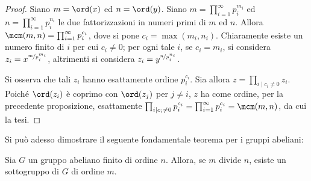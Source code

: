 \documentclass[12pt]{scrartcl}
\begin{document}
	\begin{proof}
		Siano $m = \ord(x)$ ed $n = \ord(y)$. Siano $m = \prod_{i = 1}^\infty p_i^{m_i}$
		ed $n = \prod_{i = 1}^\infty p_i^{n_i}$ le due fattorizzazioni in numeri primi
		di $m$ ed $n$. Allora $\mcm(m, n) = \prod_{i = 1}^\infty p_i^{c_i}$,
		dove si pone $c_i = \max(m_i, n_i)$. Chiaramente esiste un numero finito di
		$i$ per cui $c_i \neq 0$; per ogni tale $i$, se $c_i = m_i$, si considera
		$z_i = x^{\nicefrac{m}{p_i^{m_i}}}$, altrimenti si considera
		$z_i = y^{\nicefrac{n}{p_i^{n_i}}}$. \medskip
		
		
		Si osserva che tali $z_i$ hanno esattamente ordine $p_i^{c_i}$.
		Sia allora $z = \prod_{i \mid c_i \neq 0} z_i$. Poiché $\ord(z_i)$ è coprimo
		con $\ord(z_j)$ per $j \neq i$, $z$ ha come ordine, per la precedente proposizione,
		esattamente $\prod_{i \mid c_i \neq 0} p_i^{c_i} = \prod_{i = 1}^\infty p_i^{c_i} =
		\mcm(m, n)$, da cui la tesi.
	\end{proof}

	Si può adesso dimostrare il seguente fondamentale
	teorema per i gruppi abeliani:
	
	\begin{theorem}
		Sia $G$ un gruppo abeliano finito di ordine $n$.
		Allora, se $m$ divide $n$, esiste un sottogruppo di
		$G$ di ordine $m$.
	\end{theorem}
\end{document}

